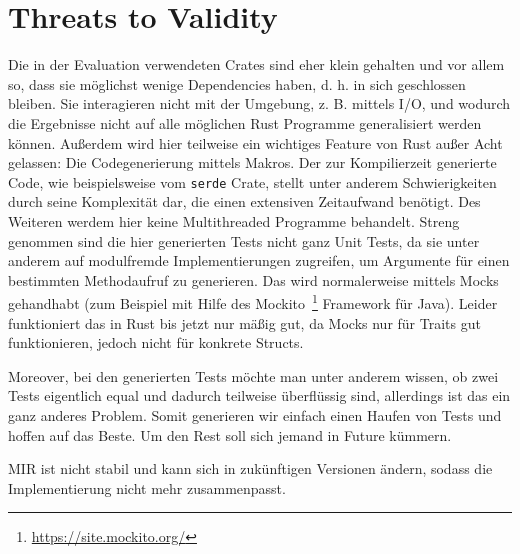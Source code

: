 \documentclass[paper=a4,%
  twoside,%
  BCOR4mm,%
  abstract=true,%
  toc=bibliography,%
  chapterprefix=true,%
  toc=bibliographynumbered,%
  open=right,%
  english,%
  pagesize=pdftex]{scrreprt}
\begin{document}
\section{Threats to Validity}
\label{sec:threats-to-validity}
Die in der Evaluation verwendeten Crates sind eher klein gehalten und vor allem so, dass sie möglichst wenige Dependencies haben, d. h. in sich geschlossen bleiben. Sie interagieren nicht mit der Umgebung, z. B. mittels I/O, und wodurch die Ergebnisse nicht auf alle möglichen Rust Programme generalisiert werden können. Außerdem wird hier teilweise ein wichtiges Feature von Rust außer Acht gelassen: Die Codegenerierung mittels Makros. Der zur Kompilierzeit generierte Code, wie beispielsweise vom \lstinline{serde} Crate, stellt unter anderem Schwierigkeiten durch seine Komplexität dar, die einen extensiven Zeitaufwand benötigt. Des Weiteren werdem hier keine Multithreaded Programme behandelt. Streng genommen sind die hier generierten Tests nicht ganz Unit Tests, da sie unter anderem auf modulfremde Implementierungen zugreifen, um Argumente für einen bestimmten Methodaufruf zu generieren. Das wird normalerweise mittels Mocks gehandhabt (zum Beispiel mit Hilfe des Mockito~\footnote{\url{https://site.mockito.org/}} Framework für Java). Leider funktioniert das in Rust bis jetzt nur mäßig gut, da Mocks nur für Traits gut funktionieren, jedoch nicht für konkrete Structs. 

Moreover, bei den generierten Tests möchte man unter anderem wissen, ob zwei Tests eigentlich equal und dadurch teilweise überflüssig sind, allerdings ist das ein ganz anderes Problem. Somit generieren wir einfach einen Haufen von Tests und hoffen auf das Beste. Um den Rest soll sich jemand in Future kümmern.

MIR ist nicht stabil und kann sich in zukünftigen Versionen ändern, sodass die Implementierung nicht mehr zusammenpasst.
\end{document}
